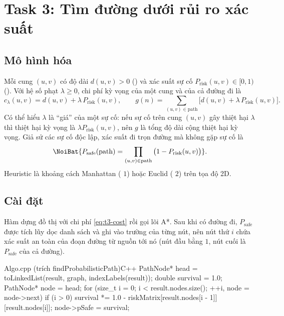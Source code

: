 \chapter{Task 3: Tìm đường dưới rủi ro xác suất}
\label{chap:task3}

\section{Mô hình hóa}
\label{sec:t3-mo-hinh}

Mỗi cung $(u, v)$ có độ dài $d(u, v) > 0$ () và xác suất sự cố
$P_{\text{risk}}(u, v) \in [0, 1)$ (). Với hệ số phạt $\lambda \ge 0$, chi phí kỳ
vọng của một cung và của cả đường đi là
\begin{equation}
  c_\lambda(u, v) = d(u, v) + \lambda\, P_{\text{risk}}(u, v), \qquad
  g(n) = \sum_{(u, v) \in \text{path}} \big[d(u, v) + \lambda\, P_{\text{risk}}(u, v)\big].
  \label{eq:t3-cost}
\end{equation}
Có thể hiểu $\lambda$ là ``giá'' của một sự cố: nếu sự cố trên cung $(u, v)$ gây thiệt hại
$\lambda$ thì thiệt hại kỳ vọng là $\lambda P_{\text{risk}}(u, v)$, nên $g$ là tổng độ dài cộng
thiệt hại kỳ vọng. Giả sử các sự cố độc lập, xác suất đi trọn đường mà không gặp sự cố là
\begin{equation}
  \NoiBat{P_{\text{safe}}(\text{path}) = \prod_{(u, v) \in \text{path}} \big(1 - P_{\text{risk}}(u, v)\big)}.
  \label{eq:t3-psafe}
\end{equation}
Heuristic là khoảng cách Manhattan ( $1$) hoặc Euclid ( $2$) trên tọa độ 2D.

\section{Cài đặt}
\label{sec:t3-cai-dat}

Hàm dựng đồ thị với chi phí \eqref{eq:t3-cost} rồi gọi lõi A*. Sau khi có đường đi,
$P_{\text{safe}}$ được tích lũy dọc danh sách và ghi vào trường  của từng nút, nên nút
thứ $i$ chứa xác suất an toàn của đoạn đường từ nguồn tới nó (nút đầu bằng $1$, nút cuối là
$P_{\text{safe}}$ của cả đường).

\begin{khungma}{Algo.cpp (trích findProbabilisticPath)}{C++}
PathNode* head = toLinkedList(result, graph, indexLabels(result));
double survival = 1.0;
PathNode* node = head;
for (size_t i = 0; i < result.nodes.size(); ++i, node = node->next) {
    if (i > 0) survival *= 1.0 - riskMatrix[result.nodes[i - 1]][result.nodes[i]];
    node->pSafe = survival;
}
\end{khungma}

